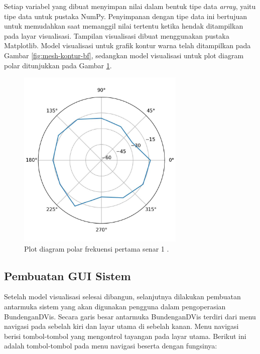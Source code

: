 Setiap variabel yang dibuat menyimpan nilai dalam bentuk tipe data \emph{array}, yaitu tipe data untuk pustaka NumPy. Penyimpanan dengan tipe data ini bertujuan untuk memudahkan saat memanggil nilai tertentu ketika hendak ditampilkan pada layar visualisasi. Tampilan visualisasi dibuat menggunakan pustaka Matplotlib. Model visualisasi untuk grafik kontur warna telah ditampilkan pada Gambar \ref{fig:mesh-kontur-bf}, sedangkan model visualisasi untuk plot diagram polar ditunjukkan pada Gambar \ref{fig:polar-plot-contoh}. \par 

\begin{figure}[h!]
	\centering
	\includegraphics[width=8cm]{Gambar/polar-contoh.jpg}
	\caption{Plot diagram polar frekuensi \overtone pertama senar 1 .}
	\label{fig:polar-plot-contoh}
\end{figure}

\subsection{Pembuatan GUI Sistem}
Setelah model visualisasi selesai dibangun, selanjutnya dilakukan pembuatan antarmuka sistem yang akan digunakan pengguna dalam pengoperasian BundenganDVis. Secara garis besar antarmuka BundenganDVis terdiri dari menu navigasi pada sebelah kiri dan layar utama di sebelah kanan. Menu navigasi berisi tombol-tombol yang mengontrol tayangan pada layar utama. Berikut ini adalah tombol-tombol pada menu navigasi beserta dengan fungsinya: \par 

